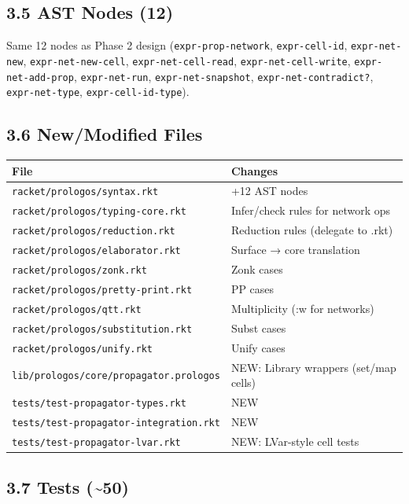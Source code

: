 \documentclass[11pt]{article}
\begin{document}
\subsection{3.5 AST Nodes (12)}
\label{sec:orgc2f3f12}

Same 12 nodes as Phase 2 design (\texttt{expr-prop-network}, \texttt{expr-cell-id},
\texttt{expr-net-new}, \texttt{expr-net-new-cell}, \texttt{expr-net-cell-read},
\texttt{expr-net-cell-write}, \texttt{expr-net-add-prop}, \texttt{expr-net-run},
\texttt{expr-net-snapshot}, \texttt{expr-net-contradict?}, \texttt{expr-net-type},
\texttt{expr-cell-id-type}).
\subsection{3.6 New/Modified Files}
\label{sec:org9fd4564}

\begin{center}
\begin{tabular}{ll}
File & Changes\\
\hline
\texttt{racket/prologos/syntax.rkt} & +12 AST nodes\\
\texttt{racket/prologos/typing-core.rkt} & Infer/check rules for network ops\\
\texttt{racket/prologos/reduction.rkt} & Reduction rules (delegate to .rkt)\\
\texttt{racket/prologos/elaborator.rkt} & Surface → core translation\\
\texttt{racket/prologos/zonk.rkt} & Zonk cases\\
\texttt{racket/prologos/pretty-print.rkt} & PP cases\\
\texttt{racket/prologos/qtt.rkt} & Multiplicity (:w for networks)\\
\texttt{racket/prologos/substitution.rkt} & Subst cases\\
\texttt{racket/prologos/unify.rkt} & Unify cases\\
\texttt{lib/prologos/core/propagator.prologos} & NEW: Library wrappers (set/map cells)\\
\texttt{tests/test-propagator-types.rkt} & NEW\\
\texttt{tests/test-propagator-integration.rkt} & NEW\\
\texttt{tests/test-propagator-lvar.rkt} & NEW: LVar-style cell tests\\
\end{tabular}
\end{center}
\subsection{3.7 Tests (\textasciitilde{}50)}
\label{sec:org0ad0888}
\end{document}
